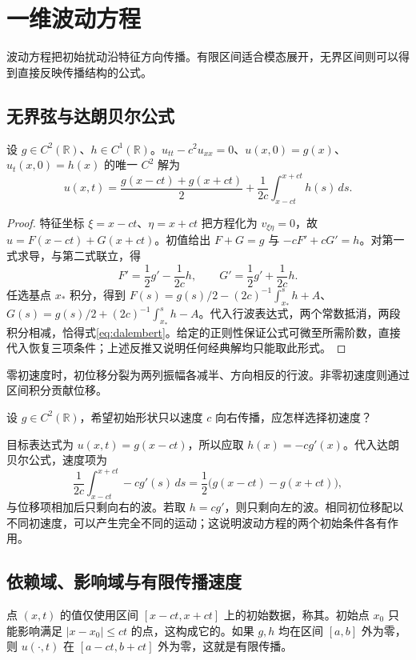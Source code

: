 \documentclass[UTF8,12pt,a4paper,fontset=fandol]{ctexbook}
\begin{document}
\chapter{一维波动方程}
\label{chap:wave-one}

波动方程把初始扰动沿特征方向传播。有限区间适合模态展开，无界区间则可以得到直接反映传播结构的公式。

\section{无界弦与达朗贝尔公式}
\begin{theorem}[达朗贝尔公式]
设 $g\in C^2(\mathbb R)$、$h\in C^1(\mathbb R)$。$u_{tt}-c^2u_{xx}=0$、$u(x,0)=g(x)$、$u_t(x,0)=h(x)$ 的唯一 $C^2$ 解为
\begin{equation}
 u(x,t)=\frac{g(x-ct)+g(x+ct)}2+
 \frac1{2c}\int_{x-ct}^{x+ct}h(s)\,ds.
 \label{eq:dalembert}
\end{equation}
\end{theorem}
\begin{proof}
特征坐标 $\xi=x-ct$、$\eta=x+ct$ 把方程化为 $v_{\xi\eta}=0$，故 $u=F(x-ct)+G(x+ct)$。初值给出 $F+G=g$ 与 $-cF'+cG'=h$。对第一式求导，与第二式联立，得
\[
 F'=\frac12g'-\frac1{2c}h,\qquad
 G'=\frac12g'+\frac1{2c}h.
\]
任选基点 $x_*$ 积分，得到 $F(s)=g(s)/2-(2c)^{-1}\int_{x_*}^s h+A$、$G(s)=g(s)/2+(2c)^{-1}\int_{x_*}^s h-A$。代入行波表达式，两个常数抵消，两段积分相减，恰得式\eqref{eq:dalembert}。给定的正则性保证公式可微至所需阶数，直接代入恢复三项条件；上述反推又说明任何经典解均只能取此形式。
\end{proof}
零初速度时，初位移分裂为两列振幅各减半、方向相反的行波。非零初速度则通过区间积分贡献位移。

\begin{example}[如何产生单向行波]
设 $g\in C^2(\mathbb R)$，希望初始形状只以速度 $c$ 向右传播，应怎样选择初速度？
\end{example}
\begin{solve}
目标表达式为 $u(x,t)=g(x-ct)$，所以应取 $h(x)=-cg'(x)$。代入达朗贝尔公式，速度项为
\[
 \frac1{2c}\int_{x-ct}^{x+ct}-cg'(s)\,ds
 =\frac12\bigl(g(x-ct)-g(x+ct)\bigr),
\]
与位移项相加后只剩向右的波。若取 $h=cg'$，则只剩向左的波。相同初位移配以不同初速度，可以产生完全不同的运动；这说明波动方程的两个初始条件各有作用。
\end{solve}

\section{依赖域、影响域与有限传播速度}
点 $(x,t)$ 的值仅使用区间 $[x-ct,x+ct]$ 上的初始数据，称其。初始点 $x_0$ 只能影响满足 $|x-x_0|\le ct$ 的点，这构成它的。如果 $g,h$ 均在区间 $[a,b]$ 外为零，则 $u(\cdot,t)$ 在 $[a-ct,b+ct]$ 外为零，这就是有限传播。
\end{document}
